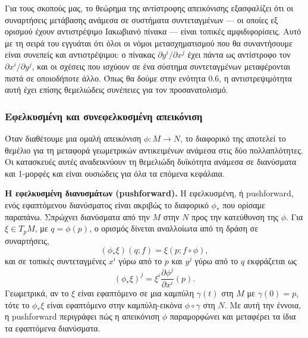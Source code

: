 \documentclass[12pt]{article}
\begin{document}
Για τους σκοπούς μας, το θεώρημα της αντίστροφης απεικόνισης εξασφαλίζει ότι οι συναρτήσεις μετάβασης ανάμεσα σε συστήματα συντεταγμένων --- οι οποίες εξ ορισμού έχουν αντιστρέψιμο Ιακωβιανό πίνακα --- είναι τοπικές αμφιδιφορίσεις. Αυτό με τη σειρά του εγγυάται ότι όλοι οι νόμοι μετασχηματισμού που θα συναντήσουμε είναι συνεπείς και αντιστρέψιμοι: ο πίνακας $\partial y^i / \partial x^j$ έχει πάντα ως αντίστροφο τον $\partial x^i / \partial y^j$, και οι σχέσεις που ισχύουν σε ένα σύστημα συντεταγμένων μεταφέρονται πιστά σε οποιοδήποτε άλλο. Όπως θα δούμε στην ενότητα 0.6, η αντιστρεψιμότητα αυτή έχει επίσης θεμελιώδεις συνέπειες για τον προσανατολισμό.

\subsubsection{Εφελκυσμένη και συνεφελκυσμένη απεικόνιση}

Όταν διαθέτουμε μια ομαλή απεικόνιση $\phi: M \to N$, το διαφορικό της αποτελεί το θεμέλιο για τη μεταφορά γεωμετρικών αντικειμένων ανάμεσα στις δύο πολλαπλότητες. Οι κατασκευές αυτές αναδεικνύουν τη θεμελιώδη δυϊκότητα ανάμεσα σε διανύσματα και 1-μορφές και είναι ουσιώδεις για όλα τα επόμενα κεφάλαια.

\textbf{Η εφελκυσμένη διανυσμάτων (pushforward).} Η εφελκυσμένη, ή pushforward, ενός εφαπτόμενου διανύσματος είναι ακριβώς το διαφορικό $\phi_*$ που ορίσαμε παραπάνω. Σπρώχνει διανύσματα από την $M$ στην $N$ προς την κατεύθυνση της $\phi$. Για $\xi \in T_pM$, με $q = \phi(p)$, ο ορισμός δίνεται αναλλοίωτα από τη δράση σε συναρτήσεις,
\[
(\phi_* \xi)(q; f) = \xi(p; f \circ \phi),
\]
και σε τοπικές συντεταγμένες $x^i$ γύρω από το $p$ και $y^j$ γύρω από το $q$ εκφράζεται ως
\[
(\phi_* \xi)^j = \xi^i \frac{\partial \phi^j}{\partial x^i}(p). \tag{0.13}
\]
Γεωμετρικά, αν το $\xi$ είναι εφαπτόμενο σε μια καμπύλη $\gamma(t)$ στη $M$ με $\gamma(0) = p$, τότε το $\phi_* \xi$ είναι εφαπτόμενο στην καμπύλη-εικόνα $\phi \circ \gamma$ στη $N$. Με αυτή την έννοια, η pushforward περιγράφει πώς η απεικόνιση $\phi$ παραμορφώνει και μεταφέρει τα ίδια τα εφαπτόμενα διανύσματα.
\end{document}
